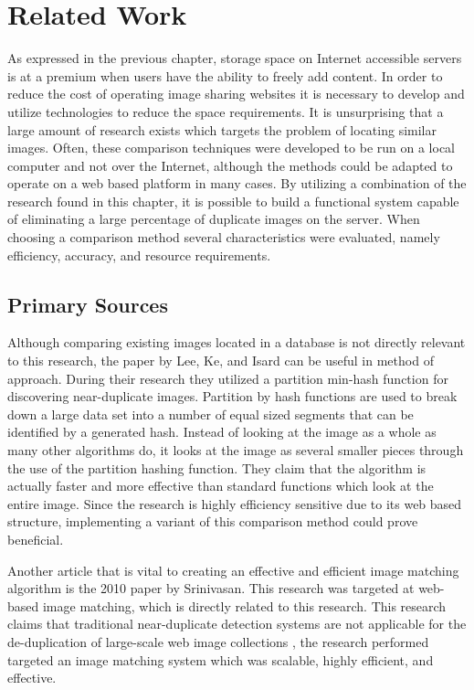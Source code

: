 %
%
\chapter{Related Work}\label{ch:relatedwork}

As expressed in the previous chapter, storage space on Internet accessible servers is at a premium when users have the ability to freely add content. In order to reduce the cost of operating image sharing websites it is necessary to develop and utilize technologies to reduce the space requirements. It is unsurprising that a large amount of research exists which targets the problem of locating similar images. Often, these comparison techniques were developed to be run on a local computer and not over the Internet, although the methods could be adapted to operate on a web based platform in many cases. By utilizing a combination of the research found in this chapter, it is possible to build a functional system capable of eliminating a large percentage of duplicate images on the server. When choosing a comparison method several characteristics were evaluated, namely efficiency, accuracy, and resource requirements.

\section{Primary Sources}
Although comparing existing images located in a database is not directly relevant to this research, the paper by Lee, Ke, and Isard \cite{Lee:2010} can be useful in method of approach. During their research they utilized a partition min-hash function for discovering near-duplicate images. Partition by hash functions are used to break down a large data set into a number of equal sized segments that can be identified by a generated hash. Instead of looking at the image as a whole as many other algorithms do, it looks at the image as several smaller pieces through the use of the partition hashing function. They claim that the algorithm is actually faster and more effective than standard functions which look at the entire image. Since the research is highly efficiency sensitive due to its web based structure, implementing a variant of this comparison method could prove beneficial.

Another article that is vital to creating an effective and efficient image matching algorithm is the 2010 paper by Srinivasan. This research was targeted at web-based image matching, which is directly related to this research. This research claims that traditional near-duplicate detection systems are not applicable for the de-duplication of large-scale web image collections \cite{Srinivasan:2008}, the research performed targeted an image matching system which was scalable, highly efficient, and effective.


